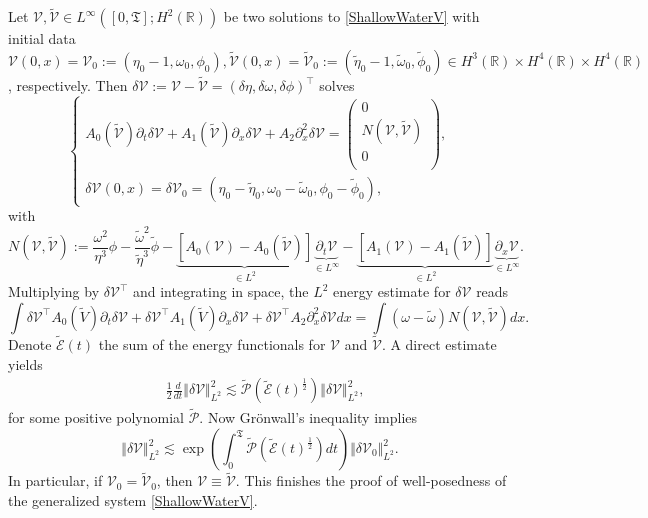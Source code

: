 \documentclass[reqno,11pt]{amsart}
\newcommand{\norm}[2]{\Vert #1 \Vert_{#2}}
\theoremstyle{plain}
\theoremstyle{definition}
\numberwithin{equation}{section}
\begin{document}
Let $\mathcal V, \tilde{\mathcal{V}} \in L^{\infty}([0,\mathfrak{T}];H^2(\mathbb{R}))$ be two solutions to \eqref{ShallowWaterV} with initial data $\mathcal V(0,x) = \mathcal V_0:= (\eta_0-1,\omega_0,\phi_0), \tilde{\mathcal{V}}(0,x) = \tilde{\mathcal V}_0 :=(\tilde{\eta}_0-1,\tilde{\omega}_0,\tilde{\phi}_0)\in H^3(\mathbb{R}) \times H^4(\mathbb{R}) \times H^4(\mathbb{R})$, respectively. Then $\delta\mathcal{V}:=\mathcal{V}-\tilde{\mathcal{V}}=(\delta\eta,\delta\omega,\delta\phi)^\top$ solves
\[
\begin{cases}
A_0(\tilde{\mathcal{V}})\partial_t\delta\mathcal{V}+A_1(\tilde{\mathcal{V}}) \partial_x \delta\mathcal{V}+A_2 \partial_x^2 \delta \mathcal{V}=\begin{pmatrix}
    0 \\ 
    N(\mathcal{V},\tilde{\mathcal{V}}) \\
    0 \\
\end{pmatrix},\\
    \delta\mathcal{V}(0,x)=\delta\mathcal{V}_0=(\eta_0-\tilde{\eta}_0,\omega_0-\tilde{\omega}_0,\phi_0-\tilde{\phi}_0),
\end{cases}
\]
with
\[
N(\mathcal{V},\tilde{\mathcal{V}}):=\frac{\omega^2}{\eta^3} \phi-\frac{\tilde{\omega}^2}{\tilde{\eta}^3} \tilde{\phi}-\underbrace{[A_0(\mathcal{V})-A_0(\tilde{\mathcal V})]}_{\in L^{2}}\underbrace{\partial_t \mathcal V}_{\in L^\infty}-\underbrace{[A_1(\mathcal{V})-A_1(\tilde{\mathcal V})]}_{\in L^{2}}\underbrace{\partial_x \mathcal V}_{\in L^\infty}.
\]
Multiplying by $\delta\mathcal{V}^\top$ and integrating in space, the $L^2$ energy estimate for $\delta \mathcal V $ reads
\begin{equation*}
    \int \delta\mathcal{V}^\top A_0(\tilde{V})\partial_t \delta\mathcal{V}+\delta\mathcal{V}^\top A_1(\tilde{V}) \partial_x \delta\mathcal{V}+\delta\mathcal{V}^\top A_2 \partial_x^2 \delta\mathcal
    V dx=\int(\omega-\tilde{\omega}) N(\mathcal{V},\tilde{\mathcal{V}}) dx.
\end{equation*}
Denote $\tilde{\mathcal{E}}(t)$ the sum of the energy functionals for $\mathcal{V}$ and $\tilde{\mathcal{V}}$. A direct estimate yields
\begin{align*}
& \frac{1}{2}\frac{d}{dt}\norm{\delta\mathcal{V}}{L^2}^2\lesssim \tilde{\mathcal{P}}(\tilde{\mathcal{E}}(t)^{\frac{1}{2}}) \norm{\delta \mathcal{V}}{L^2}^2,
\end{align*}
for some positive polynomial $\tilde{\mathcal{P}}$. Now Grönwall's inequality implies 
\begin{equation}
\label{ContDepend}
\norm{\delta\mathcal{V}}{L^2}^2\lesssim \exp \left(\int_0^{\mathfrak{T}} \tilde{\mathcal{P}}(\tilde{\mathcal{E}}(t)^{\frac{1}{2}}) dt\right) \norm{\delta\mathcal{V}_0}{L^2}^2.
\end{equation}
In particular, if $\mathcal{V}_0=\tilde{\mathcal{V}}_0$, then $\mathcal{V}\equiv \tilde{\mathcal{V}}.$ This finishes the proof of well-posedness of the generalized system \eqref{ShallowWaterV}.
\end{document}
